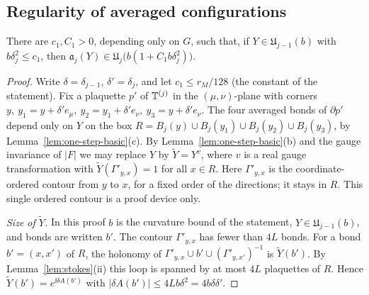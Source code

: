 \subsection{Regularity of averaged configurations}\label{ss:21.6}

\begin{lemma}\label{lem:one-step-regularity}
There are $c_1,C_1>0$, depending only on $G$, such that, if $Y\in\mathfrak U_{j-1}(b)$ with $b\delta_j^2\le c_1$, then $\mathfrak a_j(Y)\in\mathfrak U_j\big(b(1+C_1b\delta_j^2)\big)$.
\end{lemma}

\begin{proof}
Write $\delta=\delta_{j-1}$, $\delta'=\delta_j$, and let $c_1\le r_M/128$ (the constant of the statement). Fix a plaquette $p'$ of $\mathbb T^{(j)}$ in the $(\mu,\nu)$-plane with corners $y,\ y_1=y+\delta'e_\mu,\ y_2=y_1+\delta'e_\nu,\ y_3=y+\delta'e_\nu$. The four averaged bonds of $\partial p'$ depend only on $Y$ on the box $R=B_j(y)\cup B_j(y_1)\cup B_j(y_2)\cup B_j(y_3)$, by Lemma~\ref{lem:one-step-basic}(c). By Lemma~\ref{lem:one-step-basic}(b) and the gauge invariance of $|F|$ we may replace $Y$ by $\tilde Y=Y^v$, where $v$ is a real gauge transformation with $\tilde Y(\Gamma'_{y,x})=1$ for all $x\in R$. Here $\Gamma'_{y,x}$ is the coordinate-ordered contour from $y$ to $x$, for a fixed order of the directions; it stays in $R$. This single ordered contour is a proof device only.

\emph{Size of $\tilde Y$.} In this proof $b$ is the curvature bound of the statement, $Y\in\mathfrak U_{j-1}(b)$, and bonds are written $b'$. The contour $\Gamma'_{y,x}$ has fewer than $4L$ bonds. For a bond $b'=(x,x')$ of $R$, the holonomy of $\Gamma'_{y,x}\cup b'\cup(\Gamma'_{y,x'})^{-1}$ is $\tilde Y(b')$. By Lemma~\ref{lem:stokes}(ii) this loop is spanned by at most $4L$ plaquettes of $R$. Hence $\tilde Y(b')=e^{\ii\delta A(b')}$ with $|\delta A(b')|\le4Lb\delta^2=4b\delta\delta'$.


\end{proof}
